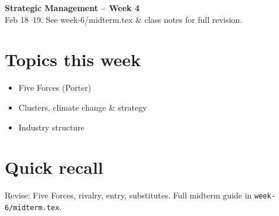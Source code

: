 \documentclass[10pt,a4paper]{article}
\begin{document}
\begin{center}
{\large\bfseries\color{eublue} Strategic Management -- Week 4}\\[0.2em]
\footnotesize Feb 18--19. See week-6/midterm.tex \& class notes for full revision.
\end{center}\vspace{0.5em}

\section*{\color{eublue}Topics this week}
\begin{itemize}
\item Five Forces (Porter)
\item Clusters, climate change \& strategy
\item Industry structure
\end{itemize}

\section*{Quick recall}
Revise: Five Forces, rivalry, entry, substitutes. Full midterm guide in \texttt{week-6/midterm.tex}.
\end{document}
